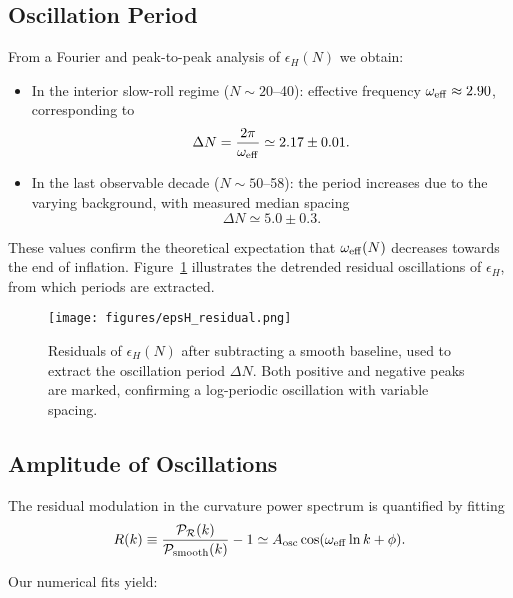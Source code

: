\documentclass[reprint, amsmath, amssymb, aps, prd, nofootinbib]{revtex4-2}
\begin{document}
\subsection{Oscillation Period}

From a Fourier and peak-to-peak analysis of $\epsilon_H(N)$ we obtain:

\begin{itemize}
    \item In the interior slow-roll regime ($N\sim 20$--40): effective frequency
    $\omega_{\rm eff} \approx 2.90$, corresponding to
    \begin{equation}
    \Delta N = \frac{2\pi}{\omega_{\rm eff}} \simeq 2.17 \pm 0.01.
    \end{equation}
    \item In the last observable decade ($N\sim 50$--58): the period increases due to the
    varying background, with measured median spacing
    \begin{equation}
    \Delta N \simeq 5.0 \pm 0.3.
    \end{equation}
\end{itemize}

These values confirm the theoretical expectation that $\omega_{\rm eff}(N)$ decreases
towards the end of inflation. Figure~\ref{fig:epsHres} illustrates the detrended residual
oscillations of $\epsilon_H$, from which periods are extracted.

\begin{figure}[t]
\centering
\texttt{[image: figures/epsH\_residual.png]}
\caption{Residuals of $\epsilon_H(N)$ after subtracting a smooth baseline,
used to extract the oscillation period $\Delta N$. Both positive and negative
peaks are marked, confirming a log-periodic oscillation with variable spacing.}
\label{fig:epsHres}
\end{figure}

\subsection{Amplitude of Oscillations}

The residual modulation in the curvature power spectrum is quantified by fitting
\begin{equation}
R(k) \equiv \frac{\mathcal{P}_\mathcal{R}(k)}{\mathcal{P}_{\rm smooth}(k)} - 1
\simeq A_{\rm osc}\cos(\omega_{\rm eff}\ln k + \phi).
\end{equation}

Our numerical fits yield:
\end{document}

